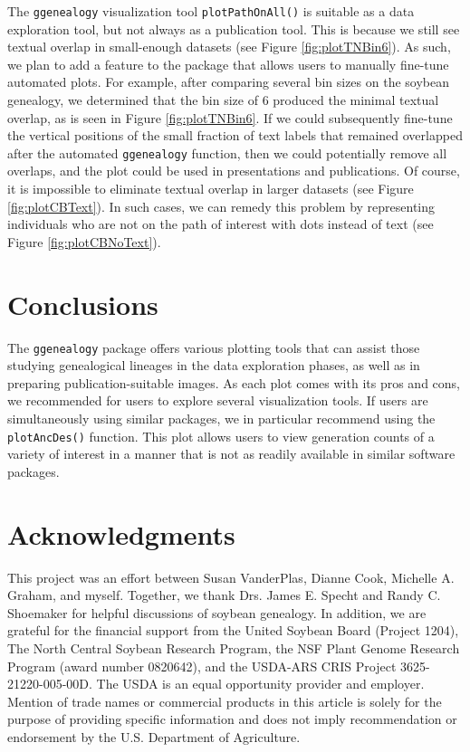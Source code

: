 \documentclass[11pt,a4paper,oldfontcommands,openany]{memoir}
\numberwithin{equation}{section} %
\newcommand{\code}[1]{{\texttt{#1}}}
\newcommand{\pkg}[1]{{\texttt{#1}}}
\begin{document}
The \pkg{ggenealogy} visualization tool \code{plotPathOnAll()} is suitable as a data exploration tool, but not always as a publication tool. This is because we still see textual overlap in small-enough datasets (see Figure \ref{fig:plotTNBin6}). As such, we plan to add a feature to the package that allows users to manually fine-tune automated plots. For example, after comparing several bin sizes on the soybean genealogy, we determined that the bin size of 6 produced the minimal textual overlap, as is seen in Figure \ref{fig:plotTNBin6}. If we could subsequently fine-tune the vertical positions of the small fraction of text labels that remained overlapped after the automated \pkg{ggenealogy} function, then we could potentially remove all overlaps, and the plot could be used in presentations and publications. Of course, it is impossible to eliminate textual overlap in larger datasets (see Figure \ref{fig:plotCBText}). In such cases, we can remedy this problem by representing individuals who are not on the path of interest with dots instead of text (see Figure \ref{fig:plotCBNoText}).

\section{Conclusions}

The \pkg{ggenealogy} package offers various plotting tools that can assist those studying genealogical lineages in the data exploration phases, as well as in preparing publication-suitable images. As each plot comes with its pros and cons, we recommended for users to explore several visualization tools. If users are simultaneously using similar packages, we in particular recommend using the \code{plotAncDes()} function. This plot allows users to view generation counts of a variety of interest in a manner that is not as readily available in similar software packages.

\section{Acknowledgments}

This project was an effort between Susan VanderPlas, Dianne Cook, Michelle A. Graham, and myself. Together, we  thank Drs. James E. Specht and Randy C. Shoemaker for helpful discussions of soybean genealogy. In addition, we are grateful for the financial support from the United Soybean Board (Project 1204), The North Central Soybean Research Program, the NSF Plant Genome Research Program (award number 0820642), and the USDA-ARS CRIS Project 3625-21220-005-00D. The USDA is an equal opportunity provider and employer. Mention of trade names or commercial products in this article is solely for the purpose of providing specific information and does not imply recommendation or endorsement by the U.S. Department of Agriculture.
\end{document}
